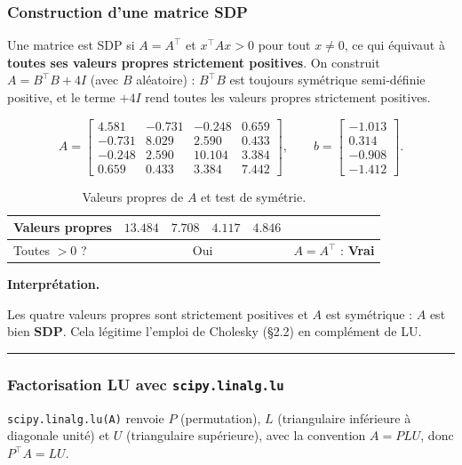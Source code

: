 \documentclass[11pt,a4paper]{article}
\newenvironment{interpret}{%
  \par\medskip\noindent
  \setlength{\fboxsep}{8pt}%
  \begin{lrbox}{\interpretbox}%
  \begin{minipage}{\dimexpr\linewidth-2\fboxsep-4pt\relax}%
  \textbf{\textcolor{boxline}{Interprétation.}}\;\ignorespaces
}{%
  \end{minipage}%
  \end{lrbox}%
  \noindent\textcolor{boxline}{\rule{3pt}{\dimexpr\ht\interpretbox+\dp\interpretbox\relax}}%
  \colorbox{boxgray}{\usebox{\interpretbox}}%
  \par\medskip
}
\begin{document}
\subsubsection{Construction d'une matrice SDP}
Une matrice est SDP si $A=A^{\top}$ et $x^{\top}Ax>0$ pour tout $x\neq 0$, ce qui équivaut à
\textbf{toutes ses valeurs propres strictement positives}. On construit $A = B^{\top}B + 4I$
(avec $B$ aléatoire) : $B^{\top}B$ est toujours symétrique semi-définie positive, et le
terme $+4I$ rend toutes les valeurs propres strictement positives.

\[
A=\begin{bmatrix}
 4.581 & -0.731 & -0.248 & 0.659\\
-0.731 & 8.029 & 2.590 & 0.433\\
-0.248 & 2.590 & 10.104 & 3.384\\
 0.659 & 0.433 & 3.384 & 7.442
\end{bmatrix},\qquad
b=\begin{bmatrix}-1.013\\0.314\\-0.908\\-1.412\end{bmatrix}.
\]

\begin{table}[H]\centering
\caption{Valeurs propres de $A$ et test de symétrie.}
\begin{tabular}{lccccc}
\toprule
Valeurs propres & $13.484$ & $7.708$ & $4.117$ & $4.846$ & \\
\midrule
Toutes $>0$ ? & \multicolumn{4}{c}{Oui} & $A=A^{\top}$ : \textbf{Vrai}\\
\bottomrule
\end{tabular}
\end{table}

\begin{interpret}
Les quatre valeurs propres sont strictement positives et $A$ est symétrique : $A$ est bien
\textbf{SDP}. Cela légitime l'emploi de Cholesky (\S2.2) en complément de LU.
\end{interpret}

\subsubsection{Factorisation LU avec \texttt{scipy.linalg.lu}}
\verb|scipy.linalg.lu(A)| renvoie $P$ (permutation), $L$ (triangulaire inférieure à diagonale
unité) et $U$ (triangulaire supérieure), avec la convention $A=PLU$, donc $P^{\top}A = LU$.
\end{document}
